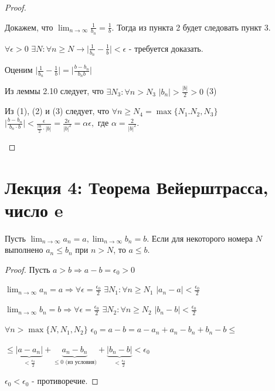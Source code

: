 \begin{proof}
\begin{enumerate}
			Докажем, что $\lim_{n \to \infty} \frac{1}{b_n} = \frac{1}{b}.$ Тогда из пункта 2 будет следовать пункт 3.
			
			$\forall \epsilon > 0$ $\exists N: \forall n \geqslant N \rightarrow \big|\frac{1}{b_n} - \frac{1}{b}\big| < \epsilon$ - требуется доказать.
			
			Оценим $\big|\frac{1}{b_n} - \frac{1}{b}\big| = \big|\frac{b - b_n}{b_n b}\big|$
			
			Из леммы 2.10 следует, что $\exists N_3: \forall n > N_3$ $|b_n| > \frac{|b|}{2} > 0$ (3)
			
			Из (1), (2) и (3) следует, что $\forall n \geqslant N_4 = \max\{N_1. N_2, N_3\}$ $\big|\frac{b - b_n}{b_n \cdot b}\big| < \frac{\epsilon}{\frac{|b|}{2} \cdot |b|} = \frac{2 \epsilon}{|b|^2} = \alpha \epsilon,$ где $\alpha = \frac{2}{|b|^2}.$ 
		\end{enumerate}
	\end{proof}
	
	\newpage
	
	\section*{Лекция 4: Теорема Вейерштрасса, число e}
	
	\begin{theorem}
		Пусть $\lim_{n \to \infty} a_n = a, \lim_{n \to \infty} b_n = b$. Если для некоторого номера $N$ выполнено $a_n \leqslant b_n$ при $n > N$, то $a \leqslant b$.
	\end{theorem}
	
	\begin{proof}
		Пусть $a > b \Rightarrow a - b = \epsilon_0 > 0$
		
		$\lim_{n \to \infty} a_n = a \Rightarrow \forall \epsilon = \frac{\epsilon_0}{2}$ $\exists N_1: \forall n \geqslant N_1$ $|a_n - a| < \frac{\epsilon_0}{2}$
		
		$\lim_{n \to \infty} b_n = b \Rightarrow \forall \epsilon = \frac{\epsilon_0}{2}$ $\exists N_2: \forall n \geqslant N_2$ $|b_n - b| < \frac{\epsilon_0}{2}$
		
		$\forall n > \max\{N, N_1, N_2\}$ $\epsilon_0 = a - b = a - a_n + a_n - b_n + b_n - b \leqslant$
		
		$\leqslant \underbrace{|a - a_n|}_{< \frac{\epsilon_0}{2}} + \underbrace{a_n - b_n}_{\leqslant 0 \text{ (из условия)}} + \underbrace{|b_n - b|}_{< \frac{\epsilon_0}{2}} < \epsilon_0$
		
		$\epsilon_0 < \epsilon_0$ - противоречие.
	\end{proof}
	
